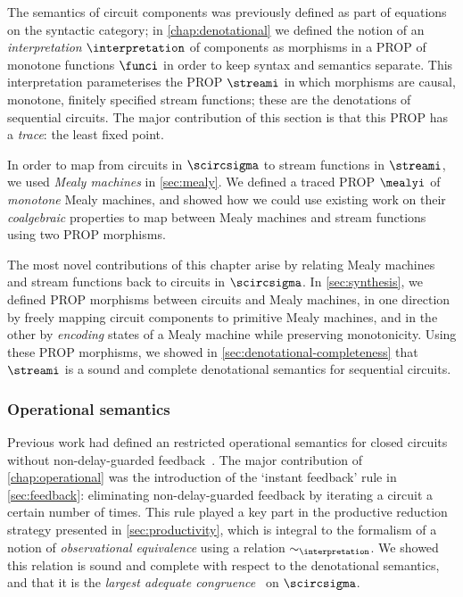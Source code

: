 The semantics of circuit components was previously defined as part of
equations on the syntactic category; in \cref{chap:denotational} we defined the
notion of an \emph{interpretation} \(\interpretation\) of components as
morphisms in a PROP of monotone functions \(\funci\) in order to keep syntax and
semantics separate.
This interpretation parameterises the PROP \(\streami\) in which morphisms are
causal, monotone, finitely specified stream functions; these are the denotations
of sequential circuits.
The major contribution of this section is that this PROP has a \emph{trace}: the
least fixed point.

In order to map from circuits in \(\scircsigma\) to stream functions in
\(\streami\), we used \emph{Mealy machines} in \cref{sec:mealy}.
We defined a traced PROP \(\mealyi\) of \emph{monotone} Mealy machines, and
showed how we could use existing work on their \emph{coalgebraic} properties
to map between Mealy machines and stream functions using two PROP morphisms.

The most novel contributions of this chapter arise by relating Mealy machines
and stream functions back to circuits in \(\scircsigma\).
In \cref{sec:synthesis}, we defined PROP morphisms between circuits and
Mealy machines, in one direction by freely mapping circuit components to
primitive Mealy machines, and in the other by \emph{encoding} states of a
Mealy machine while preserving monotonicity.
Using these PROP morphisms, we showed in \cref{sec:denotational-completeness}
that \(\streami\) is a sound and complete denotational semantics for sequential
circuits.

\subsubsection{Operational semantics}

Previous work had defined an restricted operational semantics for closed
circuits without non-delay-guarded feedback~\cite{ghica2017diagrammatic}.
The major contribution of \cref{chap:operational} was the introduction of the
`instant feedback' rule in \cref{sec:feedback}: eliminating non-delay-guarded
feedback by iterating a circuit a certain number of times.
This rule played a key part in the productive reduction strategy presented in
\cref{sec:productivity}, which is integral to the formalism of a notion
of \emph{observational equivalence} using a relation \(\sim_\interpretation\).
We showed this relation is sound and complete with respect to the
denotational semantics, and that it is the
\emph{largest adequate congruence}~\cite{morris1969lambdacalculus,gordon1980denotational}
on \(\scircsigma\).

